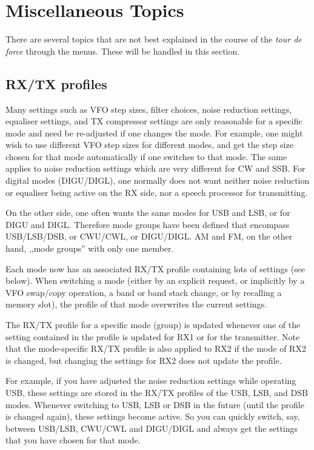 \documentclass[12pt]{book}
\begin{document}
\chapter{Miscellaneous Topics}
There are several topics that are not best explained in the course of the \textit{tour de force} through
the menus. These will be handled in this section.

\section{RX/TX profiles}
 Many settings such as VFO step sizes, filter choices, noise reduction
settings, equaliser settings, and TX compressor settings
 are only reasonable for a specific mode and need be re-adjusted if one changes
 the mode. For example, one might wish to use
 different VFO step sizes for different modes, and get the step size chosen for that
 mode automatically if one switches to that mode. The same applies to noise reduction
 settings which are very different for CW and SSB. For digital modes (DIGU/DIGL),
 one normally does not want neither noise reduction or equaliser being active on the RX
 side, nor a speech processor for transmitting.

 On the other side, one often wants the same modes for USB and LSB, or for DIGU and DIGL.
 Therefore mode groups have been defined that encompass USB/LSB/DSB, or CWU/CWL, or
 DIGU/DIGL. AM and FM, on the other hand, ,,mode groups'' with only one member.

 Each mode now has an associated RX/TX profile containing lots of settings (see below).
 When switching a mode (either by an explicit request, or implicitly by a VFO swap/copy
 operation, a band or band stack change, or by recalling a memory slot), the profile of
 that mode overwrites the current settings.

 The RX/TX profile for a specific mode (group) is updated whenever one of the setting
 contained in the profile is updated for RX1 or for the transmitter. Note that the
 mode-specific RX/TX profile is also applied to RX2 if the mode of RX2 is changed,
 but changing the settings for RX2 does not update the profile.

 For example, if you have adjusted the noise reduction settings while operating USB,
 these settings are stored in the RX/TX profiles of the USB, LSB, and DSB modes. Whenever
 switching to USB, LSB or DSB in the future (until the profile is changed again), these
 settings become active. So you can quickly switch, say, between USB/LSB, CWU/CWL and
 DIGU/DIGL and always get the settings that you have chosen for that mode.
\end{document}
